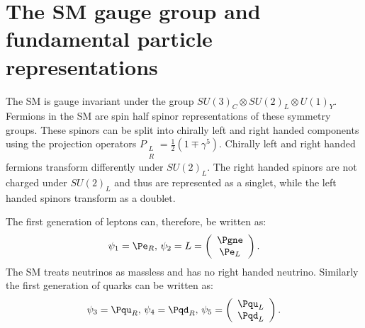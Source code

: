 \section{The SM gauge group and fundamental particle representations}
\label{sec:smgauge}
The SM is gauge invariant under the group $SU\left(3\right)_{C}\otimes SU\left(2\right)_{L}\otimes U\left(1\right)_{Y}$. Fermions in the SM are spin half spinor representations of these symmetry groups. These spinors can be split into chirally left and right handed components using the projection operators $P_{\substack{L \\R}}=\frac{1}{2}(1\mp \gamma^{5})$. Chirally left and right handed fermions transform differently under $SU\left(2\right)_{L}$. The right handed spinors are not charged under $SU\left(2\right)_{L}$ and thus are represented as a singlet, while the left handed spinors transform as a doublet.

The first generation of leptons can, therefore, be written as:
\begin{equation}
  \psi_{1}=\Pe_{R},\,\psi_{2}=L=\left(\begin{array}{c} \Pgne \\ \Pe_{L}\end{array}\right).
\end{equation}
The SM treats neutrinos as massless and has no right handed neutrino. Similarly the first generation of quarks can be written as:
\begin{equation}
  \psi_{3}=\Pqu_{R},\,\psi_{4}=\Pqd_{R},\,\psi_{5}=\left(\begin{array}{c} \Pqu_{L} \\ \Pqd_{L}\end{array}\right).
\end{equation}

